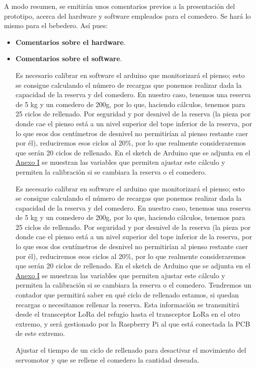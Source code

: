 \documentclass[12pt]{article}
\begin{document}
	\noindent A modo resumen, se emitirán unos comentarios previos a la presentación del prototipo, acerca del hardware y software empleados para el comedero. Se hará lo mismo para el bebedero. Así pues:
	
	\begin{itemize}
		\item \textbf{Comentarios sobre el hardware}.
		\item \textbf{Comentarios sobre el software}.
		\begin{outline}
			\1 Es necesario calibrar en software el arduino que monitorizará el pienso; esto se consigue calculando el número de recargas que ponemos realizar dada la capacidad de la reserva y del comedero. En nuestro caso, tenemos una reserva de 5 kg y un comedero de 200g, por lo que, haciendo cálculos, tenemos para 25 ciclos de rellenado. Por seguridad y por desnivel de la reserva (la pieza por donde cae el pienso está a un nivel superior del tope inferior de la reserva, por lo que esos dos centímetros de desnivel no permitirían al pienso restante caer por él), reduciremos esos ciclos al 20\%, por lo que realmente consideraremos que serán 20 ciclos de rellenado. En el sketch de Arduino que se adjunta en el \hyperref[anexo I: ficha tecnica]{Anexo I} se muestran las variables que permiten ajustar este cálculo y permiten la calibración si se cambiara la reserva o el comedero.
			
			\1 Es necesario calibrar en software el arduino que monitorizará el pienso; esto se consigue calculando el número de recargas que ponemos realizar dada la capacidad de la reserva y del comedero. En nuestro caso, tenemos una reserva de 5 kg y un comedero de 200g, por lo que, haciendo cálculos, tenemos para 25 ciclos de rellenado. Por seguridad y por desnivel de la reserva (la pieza por donde cae el pienso está a un nivel superior del tope inferior de la reserva, por lo que esos dos centímetros de desnivel no permitirían al pienso restante caer por él), reduciremos esos ciclos al 20\%, por lo que realmente consideraremos que serán 20 ciclos de rellenado. En el sketch de Arduino que se adjunta en el \hyperref[anexo I: ficha tecnica]{Anexo I} se muestran las variables que permiten ajustar este cálculo y permiten la calibración si se cambiara la reserva o el comedero. Tendremos un contador que permitirá saber en qué ciclo de rellenado estamos, si quedan recargas o necesitamos rellenar la reserva. Esta información se transmitirá desde el transceptor LoRa del refugio hasta el transceptor LoRa en el otro extremo, y será gestionado por la Raspberry Pi al que está conectada la PCB de este extremo.
			
			\1 Ajustar el tiempo de un ciclo de rellenado para desactivar el movimiento del servomotor y que se rellene el comedero la cantidad deseada. \\
		\end{outline}
	
	\end{itemize}
\end{document}
